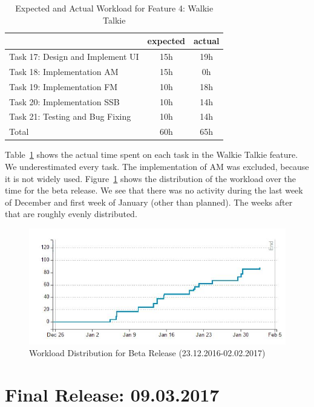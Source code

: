 	\begin{table}[!htbp]
	\centering
	\caption{Expected and Actual Workload for Feature 4: Walkie Talkie}
	\label{tab:alpha:feature4}
	\begin{tabular}{ l | c | c }
		& expected  & actual \\ \hline
		Task 17: Design and Implement UI& 15h & 19h \\ \hline
		Task 18: Implementation AM& 15h & 0h  \\ \hline
		Task 19: Implementation FM& 10h & 18h  \\ \hline
		Task 20: Implementation SSB& 10h & 14h \\ \hline 
		Task 21: Testing and Bug Fixing& 10h & 14h \\ \hline \hline
		Total & 60h & 65h
	\end{tabular}
\end{table}

Table~\ref{tab:alpha:feature4} shows the actual time spent on each task in the Walkie Talkie feature. We underestimated every task. The implementation of AM was excluded, because it is not widely used. 
Figure~\ref{fig:agilefant_beta} shows the distribution of the workload over the time for the beta release. We see that there was no activity during the last week of December and first week of January (other than planned). The weeks after that are roughly evenly distributed. 

\begin{figure}[!htbp]
	\centering
	\includegraphics[width=1\linewidth]{gfx/Agilefant_Beta.jpg}
	\caption{Workload Distribution for Beta Release (23.12.2016-02.02.2017)}
	\label{fig:agilefant_beta}
\end{figure}

\section{Final Release: 09.03.2017}

